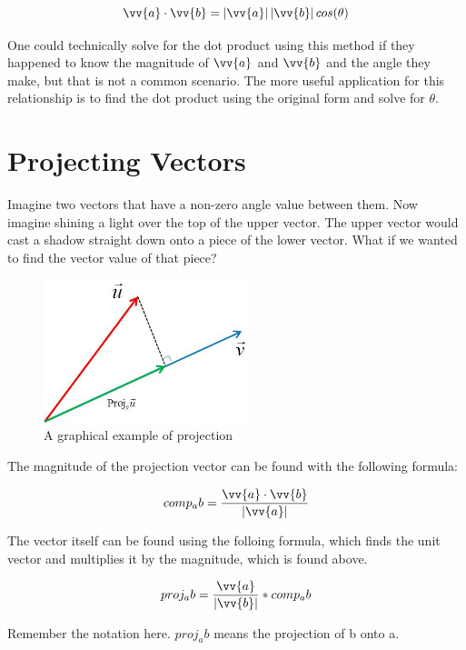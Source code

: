 \documentclass{article}
\begin{document}
$$\vv{a} \cdot \vv{b} = \left|\vv{a}\right| \left|\vv{b}\right| cos(\theta)$$

One could technically solve for the dot product using this method if they
happened to know the magnitude of $\vv{a}$ and $\vv{b}$ and the angle they
make, but that is not a common scenario. The more useful application for this
relationship is to find the dot product using the original form and solve for
$\theta$.

\section{Projecting Vectors}
Imagine two vectors that have a non-zero angle value between them. Now imagine
shining a light over the top of the upper vector. The upper vector would cast a
shadow straight down onto a piece of the lower vector. What if we wanted to
find the vector value of that piece?

\begin{figure}[H]
	\centering
	\includegraphics[width=6cm]{projection}
	\caption{A graphical example of projection}
	\label{fig:projection}
\end{figure}

The magnitude of the projection vector can be found with the following formula:

$$comp_ab = \frac{\vv{a} \cdot \vv{b}}{\left|\vv{a}\right|}$$

The vector itself can be found using the folloing formula, which finds the unit
vector and multiplies it by the magnitude, which is found above.

$$proj_ab = \frac{\vv{a}}{\left|\vv{b}\right|} * comp_ab$$

Remember the notation here. $proj_ab$ means the projection of b onto a.
\end{document}

